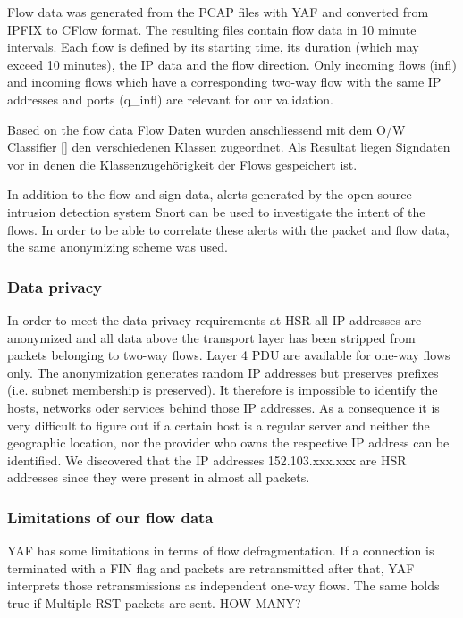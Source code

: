 \documentclass[a4paper]{scrartcl}
\begin{document}
Flow  data was generated from the PCAP files with YAF \cite{yaf} and converted from IPFIX to CFlow format. The resulting files contain flow data in 10 minute intervals. Each flow is defined by its starting time, its duration (which may exceed 10 minutes), the IP data and the flow direction. Only incoming flows (infl) and incoming flows which have a corresponding two-way flow with the same IP addresses and ports (q\_infl) are relevant for our validation.

Based on the flow data  Flow Daten wurden anschliessend mit dem O/W Classifier [] den verschiedenen Klassen zugeordnet. Als Resultat liegen Signdaten vor in denen die Klassenzugehörigkeit der Flows gespeichert ist.

In addition to the flow and sign data, alerts generated by the open-source intrusion detection system Snort can be used to investigate the intent of the flows. In order to be able to correlate these alerts with the packet and flow data, the same anonymizing scheme was used.

\subsubsection{Data privacy}
In order to meet the data privacy requirements at HSR all IP addresses are anonymized and all data above the transport layer has been stripped from packets belonging to two-way flows. Layer 4 PDU are available for one-way flows only. The anonymization generates random IP addresses but preserves prefixes (i.e. subnet membership is preserved). It therefore is impossible to identify the hosts, networks oder services behind those IP addresses. As a consequence it is very difficult to figure out if a certain host is a regular server and neither the geographic location, nor the provider who owns the respective IP address can be identified. We discovered that the IP addresses 152.103.xxx.xxx are HSR addresses since they were present in almost all packets.

\subsubsection{Limitations of our flow data}
YAF has some limitations in terms of flow defragmentation. If a connection is terminated with a FIN flag and packets are retransmitted after that, YAF interprets those retransmissions as independent one-way flows. The same holds true if Multiple RST packets are sent. HOW MANY?
\end{document}
